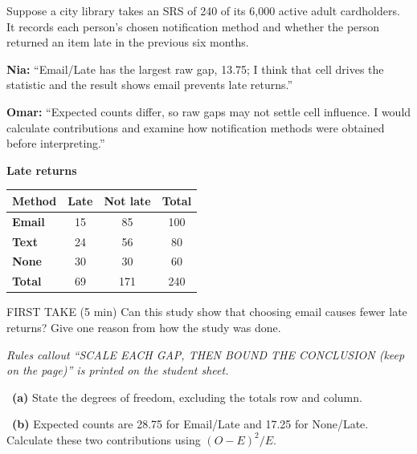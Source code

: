 \documentclass[11pt]{article}
\begin{document}
Suppose a city library takes an SRS of 240 of its 6,000 active adult cardholders. It records each person's chosen notification method and whether the person returned an item late in the previous six months.\par\smallskip \textbf{Nia:} ``Email/Late has the largest raw gap, 13.75; I think that cell drives the statistic and the result shows email prevents late returns.''\par \textbf{Omar:} ``Expected counts differ, so raw gaps may not settle cell influence. I would calculate contributions and examine how notification methods were obtained before interpreting.''\par
\begin{center}
\textbf{Late returns}\par\smallskip
\begin{tabular}{|l|c|c|c|}
\hline
\textbf{Method} & \textbf{Late} & \textbf{Not late} & \textbf{Total} \\ \hline
\textbf{Email} & 15 & 85 & 100 \\ \hline
\textbf{Text} & 24 & 56 & 80 \\ \hline
\textbf{None} & 30 & 30 & 60 \\ \hline
\textbf{Total} & 69 & 171 & 240 \\ \hline
\end{tabular}
\end{center}
\begin{firsttakebox}{FIRST TAKE (5 min)}
Can this study show that choosing email causes fewer late returns? Give one reason from how the study was done.\par
{}
\end{firsttakebox}

\textit{Rules callout ``SCALE EACH GAP, THEN BOUND THE CONCLUSION (keep on the page)'' is printed on the student sheet.}\par\medskip

~\textbf{(a)} State the degrees of freedom, excluding the totals row and column.\par
{}

~\textbf{(b)} Expected counts are 28.75 for Email/Late and 17.25 for None/Late. Calculate these two contributions using $(O-E)^2/E$.\par
{}
\end{document}
